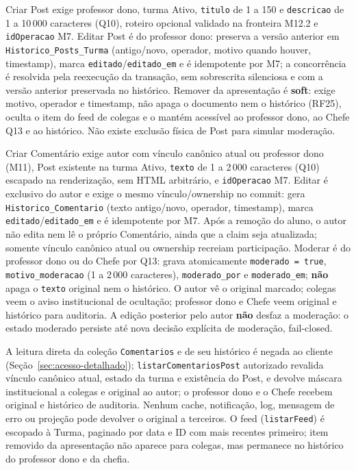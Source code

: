 \begin{regra}
Criar Post exige professor dono, turma Ativo, \texttt{titulo} de 1 a 150 e
\texttt{descricao} de 1 a 10\,000 caracteres (Q10), roteiro opcional validado na
fronteira M12.2 e \texttt{idOperacao} M7. Editar Post é do professor dono:
preserva a versão anterior em \texttt{Historico\_Posts\_Turma}
(antigo/novo, operador, motivo quando houver, timestamp), marca
\texttt{editado}/\texttt{editado\_em} e é idempotente por M7; a concorrência é
resolvida pela reexecução da transação, sem sobrescrita silenciosa e com a
versão anterior preservada no histórico. Remover da apresentação é
\textbf{soft}: exige motivo, operador e timestamp, não apaga o documento nem o
histórico (RF25), oculta o item do feed de colegas e o mantém acessível ao
professor dono, ao Chefe Q13 e ao histórico. Não existe exclusão física de Post
para simular moderação.
\end{regra}

\begin{regra}
Criar Comentário exige autor com vínculo canônico atual ou professor dono (M11),
Post existente na turma Ativo, \texttt{texto} de 1 a 2\,000 caracteres (Q10)
escapado na renderização, sem HTML arbitrário, e \texttt{idOperacao} M7. Editar
é exclusivo do autor e exige o mesmo vínculo/ownership no commit: gera
\texttt{Historico\_Comentario} (texto antigo/novo, operador, timestamp), marca
\texttt{editado}/\texttt{editado\_em} e é idempotente por M7. Após a remoção do
aluno, o autor não edita nem lê o próprio Comentário, ainda que a claim seja
atualizada; somente vínculo canônico atual ou ownership recreiam participação.
Moderar é do professor dono ou do Chefe por Q13: grava atomicamente
\texttt{moderado = true}, \texttt{motivo\_moderacao} (1 a 2\,000 caracteres),
\texttt{moderado\_por} e \texttt{moderado\_em}; \textbf{não} apaga o
\texttt{texto} original nem o histórico. O autor vê o original marcado; colegas
veem o aviso institucional de ocultação; professor dono e Chefe veem original e
histórico para auditoria. A edição posterior pelo autor \textbf{não} desfaz a
moderação: o estado moderado persiste até nova decisão explícita de moderação,
fail-closed.
\end{regra}

\begin{regra}
A leitura direta da coleção \texttt{Comentarios} e de seu histórico é negada ao
cliente (Seção~\ref{sec:acesso-detalhado}); \texttt{listarComentariosPost}
autorizado revalida vínculo canônico atual, estado da turma e existência do
Post, e devolve máscara institucional a colegas e original ao autor; o
professor dono e o Chefe recebem original e histórico de auditoria. Nenhum
cache, notificação, log, mensagem de erro ou projeção pode devolver o original
a terceiros. O feed (\texttt{listarFeed}) é escopado à Turma, paginado por
data e ID com mais recentes primeiro; item removido da apresentação não aparece
para colegas, mas permanece no histórico do professor dono e da chefia.
\end{regra}

